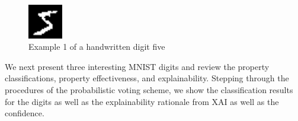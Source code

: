 \documentclass[conference]{IEEEtran}
\begin{document}

 \begin{figure}[htbp]
\centerline{\includegraphics[width=15mm]{./digit-images/5-0.png}}
\caption{Example 1 of a handwritten digit five}
\label{example1}
\end{figure}

We next present three interesting MNIST digits and review the property classifications, property effectiveness, and explainability.  Stepping through the procedures of the probabilistic voting scheme, we show the classification results for the digits as well as the explainability rationale from XAI as well as the confidence.
\end{document}
